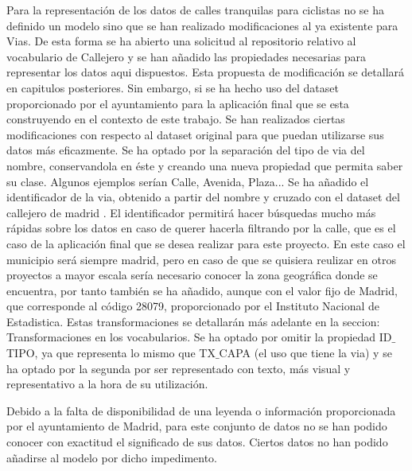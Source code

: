 Para la representación de los datos de calles tranquilas para ciclistas no se ha definido un modelo sino que se han realizado modificaciones al ya existente para Vias. De esta forma se ha abierto una solicitud al repositorio relativo al vocabulario de Callejero \cite{ciudadesbiertas_callejero} y se han añadido las propiedades necesarias para representar los datos aqui dispuestos. Esta propuesta de modificación se detallará en capitulos posteriores.
\newline
Sin embargo, si se ha hecho uso del dataset proporcionado por el ayuntamiento para la aplicación final que se esta construyendo en el contexto de este trabajo. Se han realizados ciertas modificaciones con respecto al dataset original para que puedan utilizarse sus datos más eficazmente.\newline
Se ha optado por la separación del tipo de via del nombre, conservandola en éste y creando una nueva propiedad que permita saber su clase. Algunos ejemplos serían Calle, Avenida, Plaza...
Se ha añadido el identificador de la via, obtenido a partir del nombre y cruzado con el dataset del callejero de madrid \cite{datosmadrid_callejero}. El identificador permitirá hacer búsquedas mucho más rápidas sobre los datos en caso de querer hacerla filtrando por la calle, que es el caso de la aplicación final que se desea realizar para este proyecto.\newline
En este caso el municipio será siempre madrid, pero en caso de que se quisiera reulizar en otros proyectos a mayor escala sería necesario conocer la zona geográfica donde se encuentra, por tanto también se ha añadido, aunque con el valor fijo de Madrid, que corresponde al código 28079, proporcionado por el Instituto Nacional de Estadistica\cite{datosIgnMunicipios}.\newline
Estas transformaciones se detallarán más adelante en la seccion: Transformaciones en los vocabularios.
\newline
Se ha optado por omitir la propiedad ID$\_$TIPO, ya que representa lo mismo que TX$\_$CAPA (el uso que tiene la via) y se ha optado por la segunda por ser representado con texto, más visual y representativo a la hora de su utilización.
\newline


Debido a la falta de disponibilidad de una leyenda o información proporcionada por el ayuntamiento de Madrid, para este conjunto de datos no se han podido conocer con exactitud el significado de sus datos. Ciertos datos no han podido añadirse al modelo por dicho impedimento.


